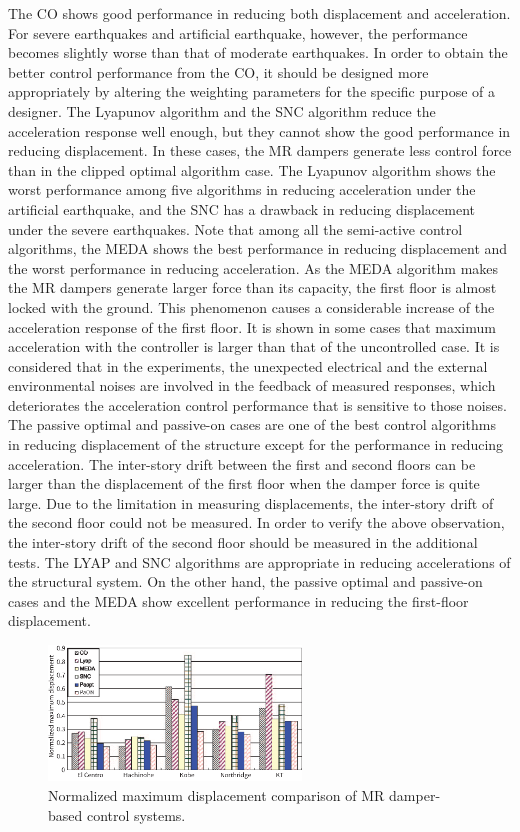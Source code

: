The CO shows good performance in reducing both displacement and acceleration. For severe earthquakes and artificial earthquake, however, the performance becomes slightly worse than that of moderate earthquakes. In order to obtain the better control performance from the CO, it should be designed more appropriately by altering the weighting parameters for the specific purpose of a designer. The Lyapunov algorithm and the SNC algorithm reduce the acceleration response well enough, but they cannot show the good performance in reducing displacement. In these cases, the MR dampers generate less control force than in the clipped optimal algorithm case. The Lyapunov algorithm shows the worst performance among five algorithms in reducing acceleration under the artificial earthquake, and the SNC has a drawback in reducing displacement under the severe earthquakes.
Note that among all the semi-active control algorithms, the MEDA shows the best performance in reducing displacement and the worst performance in reducing acceleration. As the MEDA algorithm makes the MR dampers generate larger force than its capacity, the first floor is almost locked with the ground. This phenomenon causes a considerable increase of the acceleration response of the first floor.
It is shown in some cases that maximum acceleration with the controller is larger than that of the uncontrolled case. It is considered that in the experiments, the unexpected electrical and the external environmental noises are involved in the feedback of measured responses, which deteriorates the acceleration control performance that is sensitive to those noises. The passive optimal and passive-on cases are one of the best control algorithms in reducing displacement of the structure except for the performance in reducing acceleration.
The inter-story drift between the first and second floors can be larger than the displacement of the first floor when the damper force is quite large. Due to the limitation in measuring displacements, the inter-story drift of the second floor could not be measured. In order to verify the above observation, the inter-story drift of the second floor should be measured in the additional tests. The LYAP and SNC algorithms are appropriate in reducing accelerations of the structural system. On the other hand, the passive optimal and passive-on cases and the MEDA show excellent performance in reducing the first-floor displacement.

\begin{figure}[!ht]
\centering
\includegraphics[width=0.6\textwidth] {figure/n3-14.eps}
\caption{Normalized maximum displacement comparison of MR damper-based control systems.}
\label{fig:n3-14}
\end{figure}

